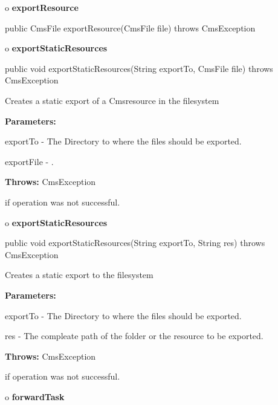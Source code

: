 o {\bf exportResource}

\begin{PRE}
 public CmsFile exportResource(CmsFile file) throws CmsException
\end{PRE}

o {\bf exportStaticResources}

\begin{PRE}
 public void exportStaticResources(String exportTo,
                                   CmsFile file) throws CmsException
\end{PRE}

\begin{description}
\htmlDD Creates a static export of a Cmsresource in the filesystem

\begin{description}
\item {\bf Parameters:}

exportTo - The Directory to where the files should be exported.

exportFile - .
\item {\bf Throws:} CmsException

if operation was not successful.
\end{description}

\end{description}

o {\bf exportStaticResources}

\begin{PRE}
 public void exportStaticResources(String exportTo,
                                   String res) throws CmsException
\end{PRE}

\begin{description}
\htmlDD Creates a static export to the filesystem

\begin{description}
\item {\bf Parameters:}

exportTo - The Directory to where the files should be exported.

res - The compleate path of the folder or the resource to be exported.
\item {\bf Throws:} CmsException

if operation was not successful.
\end{description}

\end{description}

o {\bf forwardTask}

